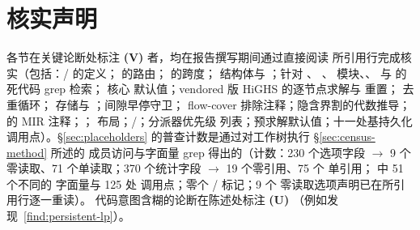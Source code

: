 \documentclass[11pt]{ctexart}
\begin{document}
\section{核实声明}
各节在关键论断处标注 \textbf{(V)} 者，均在报告撰写期间通过直接阅读
所引用行完成核实（包括：/ 的定义；
 的路由； 的跨度；
 结构体与 ；针对 、
、 模块、、
 与
 的死代码 grep 检索；
核心  默认值；vendored 版 HiGHS 的逐节点求解与
 重置； 去重循环；
 存储与 ；间隙早停守卫；
flow-cover 排除注释；隐含界割的代数推导； 的
MIR 注释；；
布局；/；分派器优先级
列表；预求解默认值；十一处基持久化调用点）。\S\ref{sec:placeholders}
的普查计数是通过对工作树执行 \S\ref{sec:census-method} 所述的
成员访问与字面量 grep 得出的（计数：230 个选项字段 $\to$ 9 个
零读取、71 个单读取；370 个统计字段 $\to$ 19 个零引用、75 个
单引用； 中 51 个不同的  字面量与 125 处
 调用点；零个 / 标记；9 个
零读取选项声明已在所引用行逐一重读）。
代码意图含糊的论断在陈述处标注 \textbf{(U)}
（例如发现~\ref{find:persistent-lp}）。
\end{document}
